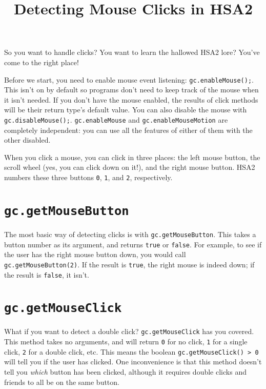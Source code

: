 \documentclass{article}
\title{Detecting Mouse Clicks in HSA2}
\date{}
\begin{document}
\maketitle

So you want to handle clicks? You want to learn the hallowed HSA2 lore? You've come to the right place!

Before we start, you need to enable mouse event listening: \texttt{gc.enableMouse();}. This isn't on by default so programs don't need to keep track of the mouse when it isn't needed. If you don't have the mouse enabled, the results of click methods will be their return type's default value. You can also disable the mouse with \texttt{gc.disableMouse();}. \texttt{gc.enableMouse} and \texttt{gc.enableMouseMotion} are completely independent: you can use all the features of either of them with the other disabled.

When you click a mouse, you can click in three places: the left mouse button, the scroll wheel (yes, you can click down on it!), and the right mouse button. HSA2 numbers these three buttons \texttt{0}, \texttt{1}, and \texttt{2}, respectively.

\section*{\texttt{gc.getMouseButton}}
The most basic way of detecting clicks is with \texttt{gc.getMouseButton}. This takes a button number as its argument, and returns \texttt{true} or \texttt{false}. For example, to see if the user has the right mouse button down, you would call \texttt{gc.getMouseButton(2)}. If the result is \texttt{true}, the right mouse is indeed down; if the result is \texttt{false}, it isn't.

\section*{\texttt{gc.getMouseClick}}
What if you want to detect a double click? \texttt{gc.getMouseClick} has you covered. This method takes no arguments, and will return \texttt{0} for no click, \texttt{1} for a single click, \texttt{2} for a double click, etc. This means the boolean \texttt{gc.getMouseClick() > 0} will tell you if the user has clicked. One inconvenience is that this method doesn't tell you \textit{which} button has been clicked, although it requires double clicks and friends to all be on the same button.
\end{document}
